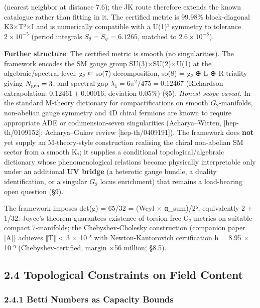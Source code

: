 \documentclass[11pt,a4paper]{article}
\begin{document}
(nearest neighbor at distance 7.6); the JK route therefore extends the known catalogue rather than fitting in it. The certified metric is 99.98\% block-diagonal K3×T²×I and is numerically compatible with a U(1)² symmetry to tolerance \(2 \times 10^{-5}\) (period integrals \(S_\theta = S_\psi = 6.1265\), matched to \(2.6 \times 10^{-8}\)).

\textbf{Further structure}: The certified metric is smooth (no singularities). The framework encodes the SM gauge group SU(3)×SU(2)×U(1) at the algebraic/spectral level: g₂ ⊂ so(7) decomposition, so(8) = g₂ ⊕ L ⊕ R triality giving \(N_{\rm gen} = 3\), and spectral gap \(\lambda_1 = 6\pi^2/475 = 0.12467\) (Richardson extrapolation: \(0.12461 \pm 0.00016\), deviation 0.05\%) (§5). \emph{Honest scope caveat.} In the standard M-theory dictionary for compactifications on smooth \(G_2\)-manifolds, non-abelian gauge symmetry and 4D chiral fermions are known to require appropriate ADE or codimension-seven singularities (Acharya--Witten, {[}hep-th/0109152{]}; Acharya--Gukov review {[}hep-th/0409191{]}). The framework does \textbf{not} yet supply an M-theory-style construction realising the chiral non-abelian SM sector from a smooth K₇; it supplies a conditional topological/algebraic dictionary whose phenomenological relations become physically interpretable only under an additional \textbf{UV bridge} (a heterotic gauge bundle, a duality identification, or a singular \(G_2\) locus enrichment) that remains a load-bearing open question (§9).

The framework imposes det(g) = 65/32 = (Weyl × α\_\allowbreak{}sum)/2⁵, equivalently 2 + 1/32. Joyce's theorem \cite{20} guarantees existence of torsion-free G₂ metrics on suitable compact 7-manifolds; the Chebyshev-Cholesky construction (companion paper {[}A{]}) achieves ‖T‖ \textless{} 3 × 10⁻⁵ with Newton-Kantorovich certification h = 8.95 × 10⁻⁹ (Chebyshev-certified, margin ×56 million; §8.5).

\subsection{2.4 Topological Constraints on Field Content}\label{topological-constraints-on-field-content}

\subsubsection{2.4.1 Betti Numbers as Capacity Bounds}\label{betti-numbers-as-capacity-bounds}
\end{document}
